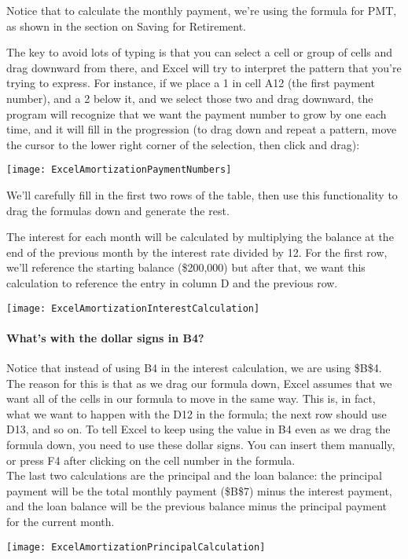 Notice that to calculate the monthly payment, we're using the formula for PMT, as shown in the section on Saving for Retirement.

The key to avoid lots of typing is that you can select a cell or group of cells and drag downward from there, and Excel will try to interpret the pattern that you're trying to express.  For instance, if we place a 1 in cell A12 (the first payment number), and a 2 below it, and we select those two and drag downward, the program will recognize that we want the payment number to grow by one each time, and it will fill in the progression (to drag down and repeat a pattern, move the cursor to the lower right corner of the selection, then click and drag):
\begin{center}
\texttt{[image: ExcelAmortizationPaymentNumbers]}
\end{center}

We'll carefully fill in the first two rows of the table, then use this functionality to drag the formulas down and generate the rest.
\vfill
\pagebreak

The interest for each month will be calculated by multiplying the balance at the end of the previous month by the interest rate divided by 12.  For the first row, we'll reference the starting balance (\$200,000) but after that, we want this calculation to reference the entry in column D and the previous row.
\begin{center}
\texttt{[image: ExcelAmortizationInterestCalculation]}
\end{center}

\paragraph{What's with the dollar signs in B4?} Notice that instead of using B4 in the interest calculation, we are using \$B\$4.  The reason for this is that as we drag our formula down, Excel assumes that we want all of the cells in our formula to move in the same way.  This is, in fact, what we want to happen with the D12 in the formula; the next row should use D13, and so on.  To tell Excel to keep using the value in B4 even as we drag the formula down, you need to use these dollar signs.  You can insert them manually, or press F4 after clicking on the cell number in the formula.\\

The last two calculations are the principal and the loan balance: the principal payment will be the total monthly payment (\$B\$7) minus the interest payment, and the loan balance will be the previous balance minus the principal payment for the current month.
\begin{center}
\texttt{[image: ExcelAmortizationPrincipalCalculation]}
\end{center}

